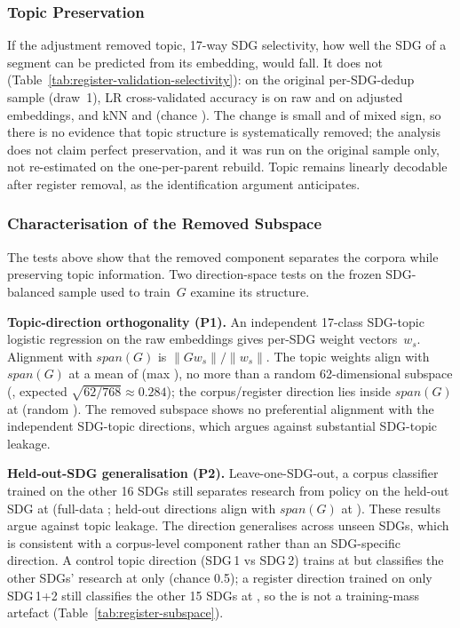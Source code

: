 \documentclass[12pt,a4paper]{article}
\begin{document}
\subsubsection{Topic Preservation}
\label{sec:regval-topic}

If the adjustment removed topic, 17-way SDG selectivity, how well the SDG of a segment can be predicted from its embedding, would fall. It does not (Table~\ref{tab:register-validation-selectivity}): on the original per-SDG-dedup sample (draw~1), LR cross-validated accuracy is \RegValSelRawLr{} on raw and \RegValSelAdjLr{} on adjusted embeddings, and kNN \RegValSelRawKnn{} and \RegValSelAdjKnn{} (chance \RegValSelChance{}). The change is small and of mixed sign, so there is no evidence that topic structure is systematically removed; the analysis does not claim perfect preservation, and it was run on the original sample only, not re-estimated on the one-per-parent rebuild. Topic remains linearly decodable after register removal, as the identification argument anticipates.

\subsubsection{Characterisation of the Removed Subspace}
\label{sec:regval-subspace}

The tests above show that the removed component separates the corpora while preserving topic information. Two direction-space tests on the frozen SDG-balanced sample used to train~$G$ examine its structure.

\textbf{Topic-direction orthogonality (P1).}
An independent 17-class SDG-topic logistic regression on the raw embeddings gives per-SDG weight vectors~$w_s$. Alignment with $span(G)$ is $\lVert Gw_s\rVert/\lVert w_s\rVert$. The topic weights align with $span(G)$ at a mean of \RegValPOneTopicAlignG{} (max \RegValPOneTopicAlignMax{}), no more than a random 62-dimensional subspace (\RegValPOneTopicAlignRand{}, expected $\sqrt{62/768}\approx0.284$); the corpus/register direction lies inside $span(G)$ at \RegValPOneCorpusAlignG{} (random \RegValPOneCorpusAlignRand{}). The removed subspace shows no preferential alignment with the independent SDG-topic directions, which argues against substantial SDG-topic leakage.

\textbf{Held-out-SDG generalisation (P2).}
Leave-one-SDG-out, a corpus classifier trained on the other 16 SDGs still separates research from policy on the held-out SDG at \RegValPTwoHeldOut{} (full-data \RegValPTwoFull{}; held-out directions align with $span(G)$ at \RegValPTwoLooAlignG{}). These results argue against topic leakage. The direction generalises across unseen SDGs, which is consistent with a corpus-level component rather than an SDG-specific direction. A control topic direction (SDG\,1 vs SDG\,2) trains at \RegValPTwoTopicCtrlTrain{} but classifies the other SDGs' research at only \RegValPTwoTopicCtrlTest{} (chance 0.5); a register direction trained on only SDG\,1+2 still classifies the other 15 SDGs at \RegValPTwoBalancedTest{}, so the \RegValPTwoHeldOut{} is not a training-mass artefact (Table~\ref{tab:register-subspace}).
\end{document}
